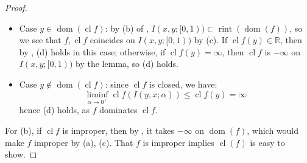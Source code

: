 \begin{proof}
	\begin{itemize}
		\item Case $y\in \operatorname{dom}(\operatorname{cl}f)$: by (b) of , $I(x,y;[0, 1))\subset \operatorname{rint}(\operatorname{dom}(f))$, so we see that $f,\operatorname{cl}f$ coincides on $I(x,y;[0,1))$ by (c). If $\operatorname{cl}f(y)\in \mathbb{R}$, then by , (d) holds in this case; otherwise, if $\operatorname{cl}f(y)=\infty$, then $\operatorname{cl}f$ is $-\infty$ on $I(x,y;[0,1))$ by the lemma, so (d) holds.
		\item Case $y\notin \operatorname{dom}(\operatorname{cl}f)$: since $\operatorname{cl}f$ is closed, we have:
		      \[
			      \underset{\alpha \to 0^+}{\operatorname{liminf}}\operatorname{cl}f(I(y,x;\alpha ))\leq \operatorname{cl}f(y)=\infty
		      \]
		      hence (d) holds, as $f$ dominates $\operatorname{cl}f$.
	\end{itemize}
	For (b), if $\operatorname{cl}f$ is improper, then by , it takes $-\infty$ on $\operatorname{dom}(f)$, which would make $f$ improper by (a), (c). That $f$ is improper implies $\operatorname{cl}(f)$ is easy to show.
\end{proof}


